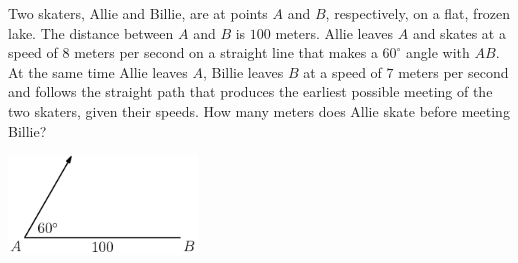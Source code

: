 Two skaters, Allie and Billie, are at points $A$ and $B$, respectively, on a flat, frozen lake. The distance between $A$ and $B$ is $100$ meters. Allie leaves $A$ and skates at a speed of $8$ meters per second on a straight line that makes a $60^\circ$ angle with $AB$. At the same time Allie leaves $A$, Billie leaves $B$ at a speed of $7$ meters per second and follows the straight path that produces the earliest possible meeting of the two skaters, given their speeds. How many meters does Allie skate before meeting Billie?

\begin{center}
\includegraphics[width = 50.400000000000006mm]{img/fig0.png}
\end{center}